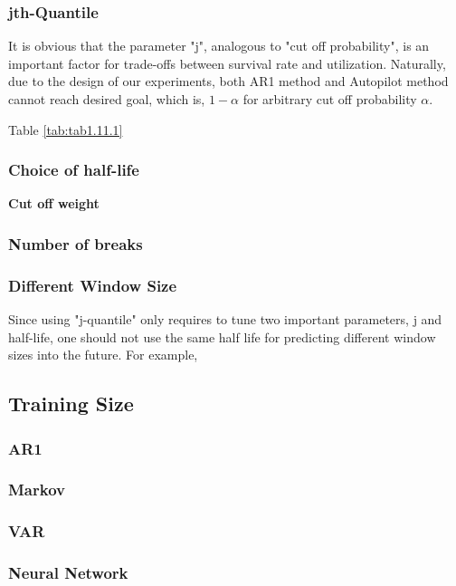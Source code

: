 \documentclass{article}
\begin{document}
\subsubsection{jth-Quantile}
It is obvious that the parameter "j", analogous to "cut off probability", is an important factor for trade-offs between survival rate and utilization. Naturally, due to the design of our experiments, both AR1 method and Autopilot method cannot reach desired goal, which is, $1 - \alpha$ for arbitrary cut off probability $\alpha$. 

Table \ref{tab:tab1.11.1}

\subsubsection{Choice of half-life}

\textbf{Cut off weight}

\subsubsection{Number of breaks}

\subsubsection{Different Window Size}
Since using "j-quantile" only requires to tune two important parameters, j and half-life, one should not use the same half life for predicting different window sizes into the future. For example, 

\subsection{Training Size}

\subsubsection{AR1}

\subsubsection{Markov}

\subsubsection{VAR}

\subsubsection{Neural Network}
\end{document}
